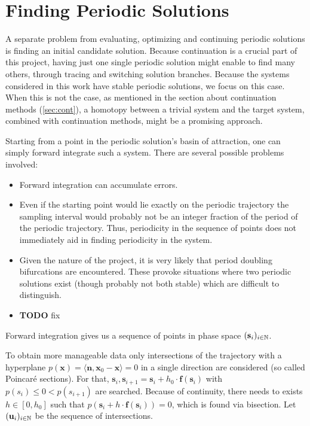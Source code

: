 \section{Finding Periodic Solutions}

A separate problem from evaluating, optimizing and continuing periodic solutions is finding an initial candidate solution.
Because continuation is a crucial part of this project, having just one single periodic solution might enable to find many others, through tracing and switching solution branches.
Because the systems considered in this work have stable periodic solutions, we focus on this case.
When this is not the case, as mentioned in the section about continuation methods (\autoref{sec:cont}), a homotopy between a trivial system and the target system, combined with continuation methods, might be a promising approach.

Starting from a point in the periodic solution's basin of attraction, one can simply forward integrate such a system.
There are several possible problems involved:
\begin{itemize}
	\item Forward integration can accumulate errors.
	\item Even if the starting point would lie exactly on the periodic trajectory the sampling interval would probably not be an integer fraction of the period of the periodic trajectory.
		Thus, periodicity in the sequence of points does not immediately aid in finding periodicity in the system.
	\item Given the nature of the project, it is very likely that period doubling bifurcations are encountered.
		These provoke situations where two periodic solutions exist (though probably not both stable) which are difficult to distinguish.
	\item \textbf{TODO} fix %
\end{itemize}
Forward integration gives us a sequence of points in phase space $(\textbf{s}_i)_{i \in \mathbb{N}}$.

To obtain more manageable data only intersections of the trajectory with a hyperplane $p(\textbf{x}) = \langle \textbf{n}, \textbf{x}_0 - \textbf{x} \rangle = 0$ in a single direction are considered (so called Poincaré sections).
For that, $\textbf{s}_i, \textbf{s}_{i+1} = \textbf{s}_i + h_0 \cdot \textbf{f}(\textbf{s}_i)$ with $p(s_i) \le 0 < p(s_{i+1})$ are searched.
Because of continuity, there needs to exists $h \in [0,h_0]$ such that $p(\textbf{s}_i + h \cdot \textbf{f}(\textbf{s}_i)) = 0$, which is found via bisection.
Let $(\textbf{u}_i)_{i \in \mathbb{N}}$ be the sequence of intersections.

